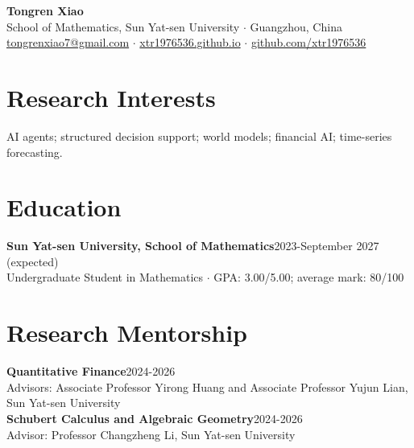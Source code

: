 \documentclass[10pt,a4paper]{article}
\newcommand{\entry}[2]{\textbf{#1}\hfill #2\\[-0.5pt]}
\begin{document}
\fontsize{9.8}{11.2}\selectfont

\begin{center}
{\Large\bfseries Tongren Xiao}\\[1pt]
School of Mathematics, Sun Yat-sen University \quad $\cdot$ \quad Guangzhou, China\\
\href{mailto:tongrenxiao7@gmail.com}{tongrenxiao7@gmail.com} \quad $\cdot$ \quad
\href{https://xtr1976536.github.io/}{xtr1976536.github.io} \quad $\cdot$ \quad
\href{https://github.com/xtr1976536}{github.com/xtr1976536}
\end{center}

\section*{Research Interests}
AI agents; structured decision support; world models; financial AI; time-series forecasting.

\section*{Education}
\entry{Sun Yat-sen University, School of Mathematics}{2023-September 2027 (expected)}
Undergraduate Student in Mathematics \quad $\cdot$ \quad GPA: 3.00/5.00; average mark: 80/100

\section*{Research Mentorship}
\entry{Quantitative Finance}{2024-2026}
Advisors: Associate Professor Yirong Huang and Associate Professor Yujun Lian, Sun Yat-sen University\\[-0.5pt]
\entry{Schubert Calculus and Algebraic Geometry}{2024-2026}
Advisor: Professor Changzheng Li, Sun Yat-sen University
\end{document}
